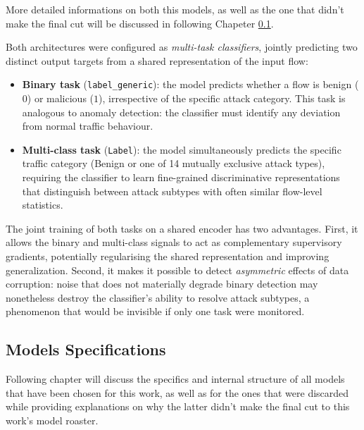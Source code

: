 \documentclass[../main.tex]{subfiles}
\begin{document}
More detailed informations on both this models, as well as the one that didn't make the final cut will be discussed in following Chapeter \ref{Chapter: models specs}.

Both architectures were configured as \emph{multi-task classifiers}, jointly predicting two distinct output targets from a shared representation of the input flow:

\begin{itemize}
    \item \textbf{Binary task} (\texttt{label\_generic}): the model predicts whether a flow is benign ($0$) or malicious ($1$), irrespective of the specific attack category. This task is analogous to anomaly detection: the classifier must identify any deviation from normal traffic behaviour.
    \item \textbf{Multi-class task} (\texttt{Label}): the model simultaneously predicts the specific traffic category (Benign or one of 14 mutually exclusive attack types), requiring the classifier to learn fine-grained discriminative representations that distinguish between attack subtypes with often similar flow-level statistics.
\end{itemize}

The joint training of both tasks on a shared encoder has two advantages.  First, it allows the binary and multi-class signals to act as complementary supervisory gradients, potentially regularising the shared representation and improving generalization.  Second, it makes it possible to detect \emph{asymmetric} effects of data corruption: noise that does not materially degrade binary detection may nonetheless destroy the classifier's ability to resolve attack subtypes, a phenomenon that would be invisible if only one task were monitored.

\newpage
\subsection{Models Specifications}
\label{Chapter: models specs}

Following chapter will discuss the specifics and internal structure of all models that have been chosen for this work, as well as for the ones that were discarded while providing explanations on why the latter didn't make the final cut to this work's model roaster.

\end{document}
